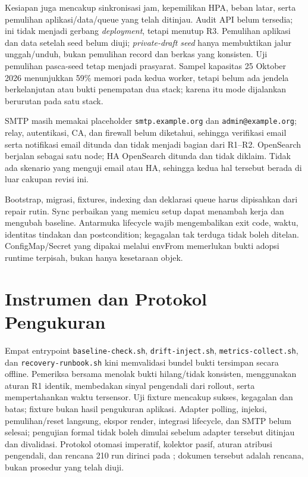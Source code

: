 Kesiapan juga mencakup sinkronisasi jam, kepemilikan HPA, beban latar, serta pemulihan aplikasi/data/queue yang telah ditinjau. Audit API belum tersedia; ini tidak menjadi gerbang \textit{deployment}, tetapi menutup R3. Pemulihan aplikasi dan data setelah seed belum diuji; \textit{private-draft seed} hanya membuktikan jalur unggah/unduh, bukan pemulihan record dan berkas yang konsisten. Uji pemulihan pasca-seed tetap menjadi prasyarat. Sampel kapasitas 25 Oktober 2026 menunjukkan 59\% memori pada kedua worker, tetapi belum ada jendela berkelanjutan atau bukti penempatan dua stack; karena itu mode dijalankan berurutan pada satu stack.

SMTP masih memakai placeholder \texttt{smtp.example.org} dan \texttt{admin@example.org}; relay, autentikasi, CA, dan firewall belum diketahui, sehingga verifikasi email serta notifikasi email ditunda dan tidak menjadi bagian dari R1--R2. OpenSearch berjalan sebagai satu node; HA OpenSearch ditunda dan tidak diklaim. Tidak ada skenario yang menguji email atau HA, sehingga kedua hal tersebut berada di luar cakupan revisi ini.

Bootstrap, migrasi, fixtures, indexing dan deklarasi queue harus dipisahkan dari repair rutin. Sync perbaikan yang memicu setup dapat menambah kerja dan mengubah baseline. Antarmuka lifecycle wajib mengembalikan exit code, waktu, identitas tindakan dan postcondition; kegagalan tak terduga tidak boleh ditelan. ConfigMap/Secret yang dipakai melalui envFrom memerlukan bukti adopsi runtime terpisah, bukan hanya kesetaraan objek.

\section{Instrumen dan Protokol Pengukuran}

Empat entrypoint \texttt{baseline-check.sh}, \texttt{drift-inject.sh}, \texttt{metrics-collect.sh}, dan \texttt{recovery-runbook.sh} kini memvalidasi bundel bukti tersimpan secara offline. Pemeriksa bersama menolak bukti hilang/tidak konsisten, menggunakan aturan R1 identik, membedakan sinyal pengendali dari rollout, serta mempertahankan waktu tersensor. Uji fixture mencakup sukses, kegagalan dan batas; fixture bukan hasil pengukuran aplikasi. Adapter polling, injeksi, pemulihan/reset langsung, ekspor render, integrasi lifecycle, dan SMTP belum selesai; pengujian formal tidak boleh dimulai sebelum adapter tersebut ditinjau dan divalidasi. Protokol otomasi imperatif, kolektor pasif, aturan atribusi pengendali, dan rencana 210 run dirinci pada ; dokumen tersebut adalah rencana, bukan prosedur yang telah diuji.

